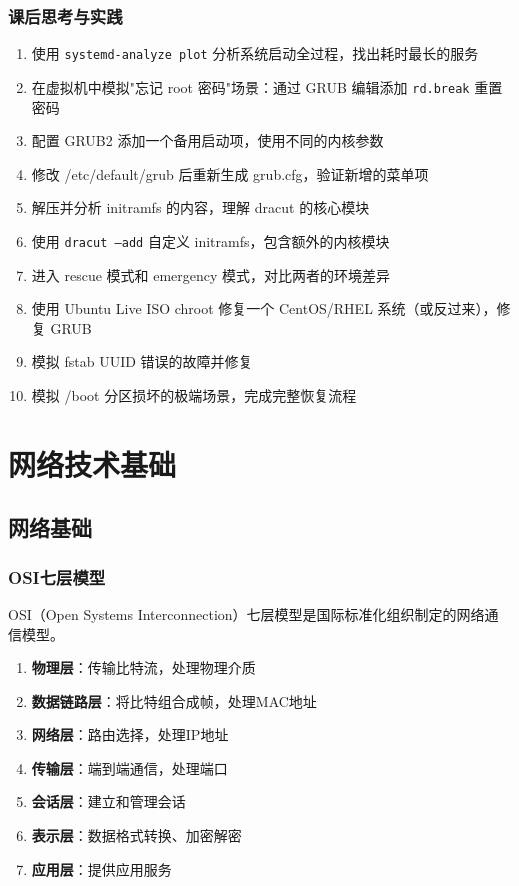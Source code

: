 \documentclass[12pt,UTF8]{ctexbook}
\begin{document}
\section{课后思考与实践}
\label{sec:boot-practice}
\begin{enumerate}
    \item 使用 \texttt{systemd-analyze plot} 分析系统启动全过程，找出耗时最长的服务
    \item 在虚拟机中模拟"忘记 root 密码"场景：通过 GRUB 编辑添加 \texttt{rd.break} 重置密码
    \item 配置 GRUB2 添加一个备用启动项，使用不同的内核参数
    \item 修改 /etc/default/grub 后重新生成 grub.cfg，验证新增的菜单项
    \item 解压并分析 initramfs 的内容，理解 dracut 的核心模块
    \item 使用 \texttt{dracut --add} 自定义 initramfs，包含额外的内核模块
    \item 进入 rescue 模式和 emergency 模式，对比两者的环境差异
    \item 使用 Ubuntu Live ISO chroot 修复一个 CentOS/RHEL 系统（或反过来），修复 GRUB
    \item 模拟 fstab UUID 错误的故障并修复
    \item 模拟 /boot 分区损坏的极端场景，完成完整恢复流程
\end{enumerate}

\part{网络技术基础}

\chapter{网络基础}
\label{chap:network-basics}

\section{OSI七层模型}
\label{sec:osi-model}

OSI（Open Systems Interconnection）七层模型是国际标准化组织制定的网络通信模型。

\begin{enumerate}
    \item \textbf{物理层}：传输比特流，处理物理介质
    \item \textbf{数据链路层}：将比特组合成帧，处理MAC地址
    \item \textbf{网络层}：路由选择，处理IP地址
    \item \textbf{传输层}：端到端通信，处理端口
    \item \textbf{会话层}：建立和管理会话
    \item \textbf{表示层}：数据格式转换、加密解密
    \item \textbf{应用层}：提供应用服务
\end{enumerate}
\end{document}
